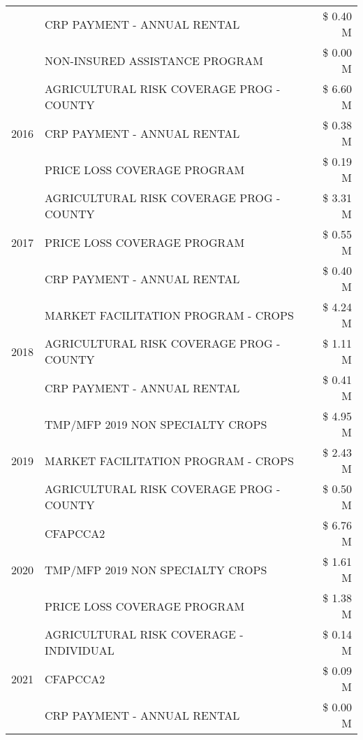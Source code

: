 \begin{tabular}{llr}
 & CRP PAYMENT - ANNUAL RENTAL & \$ 0.40 M \\
 & NON-INSURED ASSISTANCE PROGRAM & \$ 0.00 M \\
\cline{1-3}
\multirow[t]{3}{*}{2016} & AGRICULTURAL RISK COVERAGE PROG - COUNTY & \$ 6.60 M \\
 & CRP PAYMENT - ANNUAL RENTAL & \$ 0.38 M \\
 & PRICE LOSS COVERAGE PROGRAM & \$ 0.19 M \\
\cline{1-3}
\multirow[t]{3}{*}{2017} & AGRICULTURAL RISK COVERAGE PROG - COUNTY & \$ 3.31 M \\
 & PRICE LOSS COVERAGE PROGRAM & \$ 0.55 M \\
 & CRP PAYMENT - ANNUAL RENTAL & \$ 0.40 M \\
\cline{1-3}
\multirow[t]{3}{*}{2018} & MARKET FACILITATION PROGRAM - CROPS & \$ 4.24 M \\
 & AGRICULTURAL RISK COVERAGE PROG - COUNTY & \$ 1.11 M \\
 & CRP PAYMENT - ANNUAL RENTAL & \$ 0.41 M \\
\cline{1-3}
\multirow[t]{3}{*}{2019} & TMP/MFP 2019 NON SPECIALTY CROPS & \$ 4.95 M \\
 & MARKET FACILITATION PROGRAM - CROPS & \$ 2.43 M \\
 & AGRICULTURAL RISK COVERAGE PROG - COUNTY & \$ 0.50 M \\
\cline{1-3}
\multirow[t]{3}{*}{2020} & CFAPCCA2 & \$ 6.76 M \\
 & TMP/MFP 2019 NON SPECIALTY CROPS & \$ 1.61 M \\
 & PRICE LOSS COVERAGE PROGRAM & \$ 1.38 M \\
\cline{1-3}
\multirow[t]{3}{*}{2021} & AGRICULTURAL RISK COVERAGE - INDIVIDUAL & \$ 0.14 M \\
 & CFAPCCA2 & \$ 0.09 M \\
 & CRP PAYMENT - ANNUAL RENTAL & \$ 0.00 M \\
\cline{1-3}
\bottomrule
\end{tabular}
